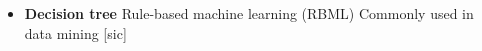 \begin{itemize}
	\item \textbf{Decision tree}
		Rule-based machine learning (RBML)
		Commonly used in data mining [sic]
\end{itemize}

%
%	
%
%
%

